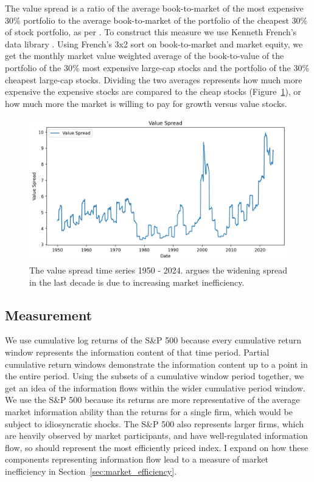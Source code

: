 The value spread is a ratio of the average book-to-market of the most expensive 30\% portfolio to the average book-to-market of the portfolio of the cheapest 30\% of stock portfolio, as per \citet{fama_french_1993}.
To construct this measure we use Kenneth French's data library \citep{french_website}. 
Using French's 3x2 sort on book-to-market and market equity, we get the monthly market value weighted average of the book-to-value of the portfolio of the 30\% most expensive large-cap stocks and the portfolio of the 30\% cheapest large-cap stocks.
Dividing the two averages represents how much more expensive the expensive stocks are compared to the cheap stocks (Figure~\ref{fig:value_spread}), or how much more the market is willing to pay for growth versus value stocks.

\begin{figure}[h!]
    \centering
    \includegraphics[width=1\textwidth]{../figs/Value Spread.png}
    \caption{The value spread time series 1950 - 2024. \citet{asness_2024} argues the widening spread in the last decade is due to increasing market inefficiency.}
    \label{fig:value_spread}
\end{figure}

\subsection{Measurement}
We use cumulative log returns of the S\&P 500 because every cumulative return window represents the information content of that time period. Partial cumulative return
windows demonstrate the information content up to a point in the entire period. Using the subsets of a cumulative window period together, we get an idea of the
information flows within the wider cumulative period window. We use the S\&P 500 because its returns are more representative of the average market information ability
than the returns for a single firm, which would be subject to idiosyncratic shocks. The S\&P 500 also represents larger firms, which are heavily observed by market participants, and have well-regulated information flow, 
so should represent the most efficiently priced index. I expand on how these components representing information flow lead to a measure of market inefficiency in Section~\ref{sec:market_efficiency}.